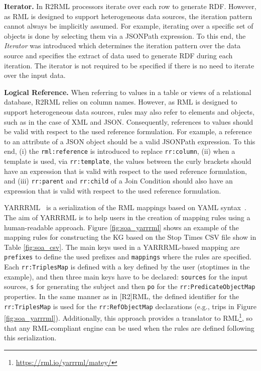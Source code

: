 \noindent\textbf{{Iterator.}} In R2RML processors iterate over each row to generate RDF. However, as RML is designed to support heterogeneous data sources, the iteration pattern cannot always be implicitly assumed. For example, iterating over a specific set of objects is done by selecting them via a JSONPath expression. To this end, the \emph{Iterator} was introduced which determines the iteration pattern over the data source and specifies the extract of data used to generate RDF during each iteration. The iterator is not required to be specified if there is no need to iterate over the input data.

\noindent\textbf{{Logical Reference.}} When referring to values in a table or views of a relational database, R2RML relies on column names. However, as RML is designed to support heterogeneous data sources, rules may also refer to elements and objects, such as in the case of XML and JSON. Consequently, references to values should be valid with respect to the used reference formulation. For example, a reference to an attribute of a JSON object should be a valid JSONPath expression. To this end, (i) the \verb|rml:reference| is introduced to replace \verb|rr:column|, (ii) when a template is used, via \verb|rr:template|, the values between the curly brackets should have an expression that is valid with respect to the used reference formulation, and (iii) \verb|rr:parent| and \verb|rr:child| of a Join Condition should also have an expression that is valid with respect to the used reference formulation.


YARRRML~\citep{Heyvaert2018Declarative} is a serialization of the RML mappings based on YAML syntax~\citep{ben2001yaml}. The aim of YARRRML is to help users in the creation of mapping rules using a human-readable approach. Figure \ref{fig:soa_yarrrml} shows an example of the mapping rules for constructing the KG based on the Stop Times CSV file show in Table \ref{fig:soa_csv}. The main keys used in a YARRRML-based mapping are \texttt{prefixes} to define the used prefixes and \texttt{mappings} where the rules are specified. Each \texttt{rr:TriplesMap} is defined with a key defined by the user (stoptimes in the example), and then three main keys have to be declared: \texttt{sources} for the input sources, \texttt{s} for generating the subject and then \texttt{po} for the \texttt{rr:PredicateObjectMap} properties. In the same manner as in [R2]RML, the defined identifier for the \texttt{rr:TriplesMap} is used for the \texttt{rr:RefObjectMap} declarations (e.g., trips in Figure \ref{fig:soa_yarrrml}). Additionally, this approach provides a translator to RML\footnote{\url{https://rml.io/yarrrml/matey/}}, so that any RML-compliant engine can be used when the rules are defined following this serialization.




